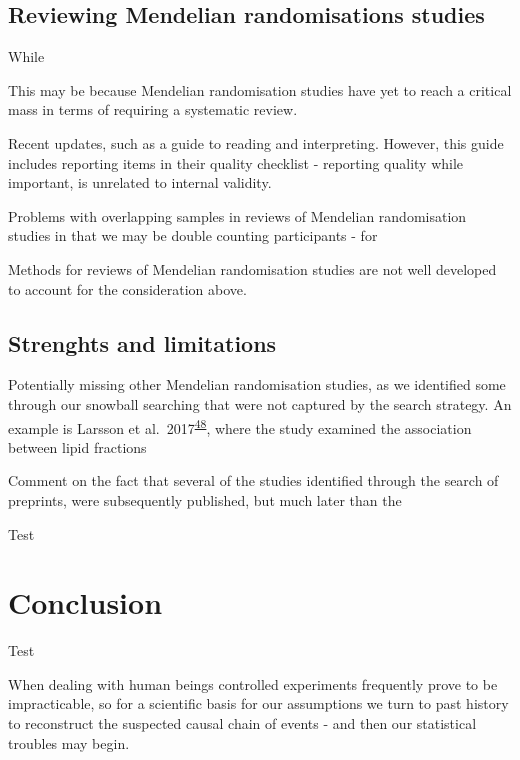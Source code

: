 \documentclass[a4paper, twoside]{templates/ociamthesis}
\begin{document}
\hypertarget{reviewing-mendelian-randomisations-studies}{%
\subsection{Reviewing Mendelian randomisations studies}\label{reviewing-mendelian-randomisations-studies}}

While

This may be because Mendelian randomisation studies have yet to reach a critical mass in terms of requiring a systematic review.

Recent updates, such as a guide to reading and interpreting. However, this guide includes reporting items in their quality checklist - reporting quality while important, is unrelated to internal validity.

Problems with overlapping samples in reviews of Mendelian randomisation studies in that we may be double counting participants - for

Methods for reviews of Mendelian randomisation studies are not well developed to account for the consideration above.

\hypertarget{strenghts-and-limitations}{%
\subsection{Strenghts and limitations}\label{strenghts-and-limitations}}

Potentially missing other Mendelian randomisation studies, as we identified some through our snowball searching that were not captured by the search strategy. An example is Larsson et al.~2017\textsuperscript{\protect\hyperlink{ref-larsson2017a}{48}}, where the study examined the association between lipid fractions

Comment on the fact that several of the studies identified through the search of preprints, were subsequently published, but much later than the

Test

\hypertarget{conclusion}{%
\section{Conclusion}\label{conclusion}}

Test

\begin{savequote}
When dealing with human beings controlled experiments frequently prove
to be impracticable, so for a scientific basis for our assumptions we
turn to past history to reconstruct the suspected causal chain of events
- and then our statistical troubles may begin.
\end{savequote}
\end{document}
